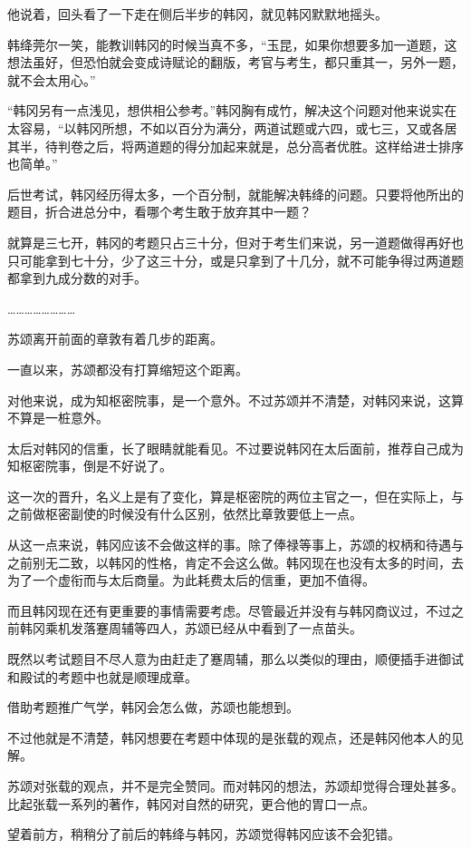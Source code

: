 他说着，回头看了一下走在侧后半步的韩冈，就见韩冈默默地摇头。

韩绛莞尔一笑，能教训韩冈的时候当真不多，“玉昆，如果你想要多加一道题，这想法虽好，但恐怕就会变成诗赋论的翻版，考官与考生，都只重其一，另外一题，就不会太用心。”

“韩冈另有一点浅见，想供相公参考。”韩冈胸有成竹，解决这个问题对他来说实在太容易，“以韩冈所想，不如以百分为满分，两道试题或六四，或七三，又或各居其半，待判卷之后，将两道题的得分加起来就是，总分高者优胜。这样给进士排序也简单。”

后世考试，韩冈经历得太多，一个百分制，就能解决韩绛的问题。只要将他所出的题目，折合进总分中，看哪个考生敢于放弃其中一题？

就算是三七开，韩冈的考题只占三十分，但对于考生们来说，另一道题做得再好也只可能拿到七十分，少了这三十分，或是只拿到了十几分，就不可能争得过两道题都拿到九成分数的对手。

……………………

苏颂离开前面的章敦有着几步的距离。

一直以来，苏颂都没有打算缩短这个距离。

对他来说，成为知枢密院事，是一个意外。不过苏颂并不清楚，对韩冈来说，这算不算是一桩意外。

太后对韩冈的信重，长了眼睛就能看见。不过要说韩冈在太后面前，推荐自己成为知枢密院事，倒是不好说了。

这一次的晋升，名义上是有了变化，算是枢密院的两位主官之一，但在实际上，与之前做枢密副使的时候没有什么区别，依然比章敦要低上一点。

从这一点来说，韩冈应该不会做这样的事。除了俸禄等事上，苏颂的权柄和待遇与之前别无二致，以韩冈的性格，肯定不会这么做。韩冈现在也没有太多的时间，去为了一个虚衔而与太后商量。为此耗费太后的信重，更加不值得。

而且韩冈现在还有更重要的事情需要考虑。尽管最近并没有与韩冈商议过，不过之前韩冈乘机发落蹇周辅等四人，苏颂已经从中看到了一点苗头。

既然以考试题目不尽人意为由赶走了蹇周辅，那么以类似的理由，顺便插手进御试和殿试的考题中也就是顺理成章。

借助考题推广气学，韩冈会怎么做，苏颂也能想到。

不过他就是不清楚，韩冈想要在考题中体现的是张载的观点，还是韩冈他本人的见解。

苏颂对张载的观点，并不是完全赞同。而对韩冈的想法，苏颂却觉得合理处甚多。比起张载一系列的著作，韩冈对自然的研究，更合他的胃口一点。

望着前方，稍稍分了前后的韩绛与韩冈，苏颂觉得韩冈应该不会犯错。

